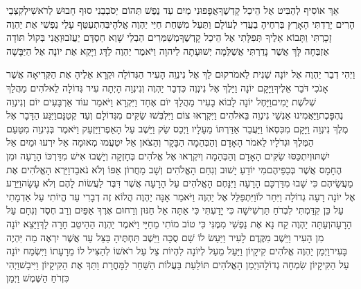 \documentclass[../main/main.tex]{subfiles}
\begin{document}
\begin{multicols}{\ncols}
אֵךְ\SubEnd{} אוֹסִיף לְהַבִּיט אֶל הֵיכַל קָדְשֶׁךָ\PreVerseSpace{}אֲפָפוּנִי מַיִם עַד נֶפֶשׁ תְּהוֹם יְסֹבְבֵנִי סוּף חָבוּשׁ לְרֹאשִׁי\PreVerseSpace{}לְקִצְבֵי הָרִים יָרַדְתִּי הָאָרֶץ בְּרִחֶיהָ בַעֲדִי לְעוֹלָם וַתַּעַל מִשַּׁחַת חַיַּי יַהְוֶה אֱלֹהָי\PreVerseSpace{}בְּהִתְעַטֵּף עָלַי נַפְשִׁי אֶת יַהְוֶה זָכָרְתִּי וַתָּבוֹא אֵלֶיךָ תְּפִלָּתִי אֶל הֵיכַל קָדְשֶׁךָ\PreVerseSpace{}מְשַׁמְּרִים הַבְלֵי שָׁוְא חַסְדָּם יַעֲזֹבוּ\PreVerseSpace{}וַאֲנִי בְּקוֹל תּוֹדָה אֶזְבְּחָה לָּךְ אֲשֶׁר נָדַרְתִּי אֲשַׁלֵּמָה יְשׁוּעָתָה לַיהוָה \ClosedSection{}וַיֹּאמֶר יַהְוֶה לַדָּג וַיָּקֵא אֶת יוֹנָה אֶל הַיַּבָּשָׁה\OpenSection{}\par
{}וַיְהִי דְבַר יַהְוֶה אֶל יוֹנָה שֵׁנִית לֵאמֹר\PreVerseSpace{}קוּם לֵךְ אֶל נִינְוֵה הָעִיר הַגְּדוֹלָה וּקְרָא אֵלֶיהָ אֶת הַקְּרִיאָה אֲשֶׁר אָנֹכִי דֹּבֵר אֵלֶיךָ\PreVerseSpace{}וַיָּקָם יוֹנָה וַיֵּלֶךְ אֶל נִינְוֶה כִּדְבַר יַהְוֶה וְנִינְוֵה הָיְתָה עִיר גְּדוֹלָה לֵאלֹהִים מַהֲלַךְ שְׁלֹשֶׁת יָמִים\PreVerseSpace{}וַיָּחֶל יוֹנָה לָבוֹא בָעִיר מַהֲלַךְ יוֹם אֶחָד וַיִּקְרָא וַיֹּאמַר עוֹד אַרְבָּעִים יוֹם וְנִינְוֵה נֶהְפָּכֶת\PreVerseSpace{}וַיַּאֲמִינוּ אַנְשֵׁי נִינְוֵה בֵּאלֹהִים וַיִּקְרְאוּ צוֹם וַיִּלְבְּשׁוּ שַׂקִּים מִגְּדוֹלָם וְעַד קְטַנָּם\PreVerseSpace{}וַיִּגַּע הַדָּבָר אֶל מֶלֶךְ נִינְוֵה וַיָּקָם מִכִּסְאוֹ וַיַּעֲבֵר אַדַּרְתּוֹ מֵעָלָיו וַיְכַס שַׂק וַיֵּשֶׁב עַל הָאֵפֶר\PreVerseSpace{}וַיַּזְעֵק וַיֹּאמֶר בְּנִינְוֵה מִטַּעַם הַמֶּלֶךְ וּגְדֹלָיו לֵאמֹר הָאָדָם וְהַבְּהֵמָה הַבָּקָר וְהַצֹּאן אַל יִטְעֲמוּ מְאוּמָה אַל יִרְעוּ וּמַיִם אַל יִשְׁתּוּ\PreVerseSpace{}וְיִתְכַּסּוּ שַׂקִּים הָאָדָם וְהַבְּהֵמָה וְיִקְרְאוּ אֶל אֱלֹהִים בְּחָזְקָה וְיָשֻׁבוּ אִישׁ מִדַּרְכּוֹ הָרָעָה וּמִן הֶחָמָס אֲשֶׁר בְּכַפֵּיהֶם\PreVerseSpace{}מִי יוֹדֵעַ יָשׁוּב וְנִחַם הָאֱלֹהִים וְשָׁב מֵחֲרוֹן אַפּוֹ וְלֹא נֹאבֵד\PreVerseSpace{}וַיַּרְא הָאֱלֹהִים אֶת מַעֲשֵׂיהֶם כִּי שָׁבוּ מִדַּרְכָּם הָרָעָה וַיִּנָּחֶם הָאֱלֹהִים עַל הָרָעָה אֲשֶׁר דִּבֶּר לַעֲשׂוֹת לָהֶם וְלֹא עָשָׂה\PreChapterSpace{}וַיֵּרַע אֶל יוֹנָה רָעָה גְדוֹלָה וַיִּחַר לוֹ\PreVerseSpace{}וַיִּתְפַּלֵּל אֶל יַהְוֶה וַיֹּאמַר אָנָּה יַהְוֶה הֲלוֹא זֶה דְבָרִי עַד הֱיוֹתִי עַל אַדְמָתִי עַל כֵּן קִדַּמְתִּי לִבְרֹחַ תַּרְשִׁישָׁה כִּי יָדַעְתִּי כִּי אַתָּה אֵל חַנּוּן וְרַחוּם אֶרֶךְ אַפַּיִם וְרַב חֶסֶד וְנִחָם עַל הָרָעָה\PreVerseSpace{}וְעַתָּה יַהְוֶה קַח נָא אֶת נַפְשִׁי מִמֶּנִּי כִּי טוֹב מוֹתִי מֵחַיָּי \ClosedSection{}וַיֹּאמֶר יַהְוֶה הַהֵיטֵב חָרָה לָךְ\PreVerseSpace{}וַיֵּצֵא יוֹנָה מִן הָעִיר וַיֵּשֶׁב מִקֶּדֶם לָעִיר וַיַּעַשׂ לוֹ שָׁם סֻכָּה וַיֵּשֶׁב תַּחְתֶּיהָ בַּצֵּל עַד אֲשֶׁר יִרְאֶה מַה יִּהְיֶה בָּעִיר\PreVerseSpace{}וַיְמַן יַהְוֶה אֱלֹהִים קִיקָיוֹן וַיַּעַל מֵעַל לְיוֹנָה לִהְיוֹת צֵל עַל רֹאשׁוֹ לְהַצִּיל לוֹ מֵרָעָתוֹ וַיִּשְׂמַח יוֹנָה עַל הַקִּיקָיוֹן שִׂמְחָה גְדוֹלָה\PreVerseSpace{}וַיְמַן הָאֱלֹהִים תּוֹלַעַת בַּעֲלוֹת הַשַּׁחַר לַמָּחֳרָת וַתַּךְ אֶת הַקִּיקָיוֹן וַיִּיבָשׁ\PreVerseSpace{}וַיְהִי כִּזְרֹחַ הַשֶּׁמֶשׁ וַיְמַן 
\end{multicols}
\end{document}
